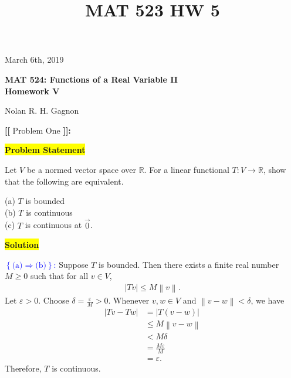 \documentclass[12pt]{article}
\title{MAT 523 HW 5}
\newcommand\norm[1]{\left\lVert#1\right\rVert}
\newcommand{\mybox}{%
    \collectbox{%
        \setlength{\fboxsep}{2pt}%
        \fbox{\BOXCONTENT}%
    }%
}
\begin{document}
\hfill March 6th, 2019
\begin{center}
\begin{large}
\textbf{MAT 524: Functions of a Real Variable II \\
\vspace{-5mm}
Homework V \\}
\end{large}
\vspace{-2mm}
Nolan R. H. Gagnon \\
\end{center}

\noindent \textbf{{\huge [}{\Large [}} Problem One \textbf{{\Large ]}{\huge ]}}{\Large \textbf{:}}

\vspace{3mm}

\noindent\mybox{\colorbox{yellow}{\textbf{Problem Statement}}}\hspace{3mm}\hrulefill

\noindent Let $V$ be a normed vector space over $\mathbb{R}$. For a linear functional $T:V\rightarrow\mathbb{R}$, show that the following are equivalent.
\begin{flushleft}
(a) $T$ is bounded \\
(b) $T$ is continuous \\
(c) $T$ is continuous at $\vec{0}$.
\end{flushleft}

\vspace{5mm}

\noindent\mybox{\colorbox{yellow}{\textbf{Solution}}}\hspace{3mm}\hrulefill

\noindent \textcolor{blue}{$\left\lbrace \text{(a)} \Rightarrow \text{(b)} \right\rbrace$:} Suppose $T$ is bounded. Then there exists a finite real number $M\geq 0$ such that for all $v\in V$, \begin{align}
    |Tv| \leq M \norm{v}.
\end{align}
Let $\varepsilon > 0$. Choose $\delta = \frac{\varepsilon}{M} > 0.$ Whenever $v,w\in V$ and $\norm{v-w} < \delta$, we have
\begin{align}
    |Tv - Tw| &= |T(v-w)|\\
    &\leq M \norm{v-w} \\
    &< M\delta \\
    &= \frac{M\varepsilon}{M} \\
    &= \varepsilon.
\end{align}
Therefore, $T$ is continuous.  
\end{document}
